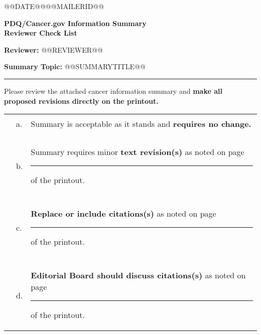 \documentclass[letterpaper,12pt]{letter}
\begin{document}
\thispagestyle{empty}

@@DATE@@\hfill @@MAILERID@@ \\
\begin{center}
 \textbf{PDQ\textregistered/Cancer.gov Information Summary \\
         Reviewer Check List}
\end{center}

\vspace{24pt}

\textbf{Reviewer: } @@REVIEWER@@

\vspace{12pt}

\textbf{Summary Topic: } @@SUMMARYTITLE@@

\rule{6.5in}{.02in}

\vspace{12pt}

Please review the attached cancer information summary and \textbf{make
all proposed revisions directly on the printout.}

\vspace{12pt}

\begin{tabular}{llp{4.5in}}
\hspace{.25in}\rule{1in}{.01in} & a. & Summary is acceptable as it stands 
                                      and \textbf{requires no change.} \\
\\
\hspace{.25in}\rule{1in}{.01in} & b. & Summary requires minor \textbf{text
                                      revision(s)} as noted on page
                                      \rule{.5in}{.01in} of the printout. \\
\\
\hspace{.25in}\rule{1in}{.01in} & c. & \textbf{Replace or include citations(s)}
                                      as noted on page \rule{.5in}{.01in}
                                      of the printout. \\
\\
\hspace{.25in}\rule{1in}{.01in} & d. & \textbf{Editorial Board should discuss
                                      citations(s)} as noted on page
                                      \rule{.5in}{.01in} of the printout.
\end{tabular}
\end{document}
